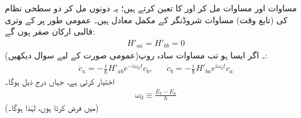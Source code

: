 مساوات  اور مساوات  مل کر  اور  کا تعین کرتے ہیں؛ یہ دونوں مل کر دو سطحی نظام کی (تابع وقت) مساوات شروڈنگر کے مکمل معادل ہیں۔ عمومی طور پر  کے وتری قالبی ارکان صفر ہوں گے:
\begin{align}
	H'_{aa}=H'_{bb}=0
\end{align}
 (عمومی صورت کے لیے سوال  دیکھیں)۔ اگر ایسا ہو تب مساوات سادہ روپ:
\begin{align}\label{مساوات_تابع_مضطرب_شرح_ضربیات}
	\dot{c}_a=-\frac{i}{\hslash}H'_{ab}e^{-i\omega_0t}c_b,&&\dot{c}_b=-\frac{i}{\hslash}H'_{ba}e^{i\omega_0t}c_a
\end{align}
 اختیار کرتی ہے، جہاں درج ذیل ہوگا۔
\begin{align}
	\omega_0\equiv\frac{E_b-E_a}{\hslash}
\end{align}
(میں  فرض کرتا ہوں، لہٰذا  ہوگا۔)



